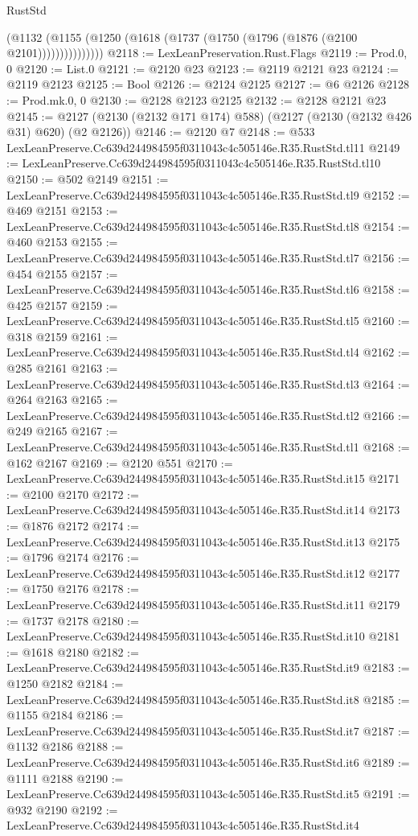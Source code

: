 \begin{lexlean}{RustStd}
\begin{coremodule}
                (@1132 (@1155 (@1250 (@1618 (@1737 (@1750 (@1796 (@1876 (@2100 @2101)))))))))))))))
@2118 := LexLeanPreservation.Rust.Flags
@2119 := Prod.{0, 0}
@2120 := List.{0}
@2121 := @2120 @23
@2123 := @2119 @2121 @23
@2124 := @2119 @2123
@2125 := Bool
@2126 := @2124 @2125
@2127 := @6 @2126
@2128 := Prod.mk.{0, 0}
@2130 := @2128 @2123 @2125
@2132 := @2128 @2121 @23
@2145 := @2127 (@2130 (@2132 @171 @174) @588) (@2127 (@2130 (@2132 @426 @31) @620) (@2 @2126))
@2146 := @2120 @7
@2148 := @533 LexLeanPreserve.Cc639d244984595f0311043c4c505146e.R35.RustStd.tl11
@2149 := LexLeanPreserve.Cc639d244984595f0311043c4c505146e.R35.RustStd.tl10
@2150 := @502 @2149
@2151 := LexLeanPreserve.Cc639d244984595f0311043c4c505146e.R35.RustStd.tl9
@2152 := @469 @2151
@2153 := LexLeanPreserve.Cc639d244984595f0311043c4c505146e.R35.RustStd.tl8
@2154 := @460 @2153
@2155 := LexLeanPreserve.Cc639d244984595f0311043c4c505146e.R35.RustStd.tl7
@2156 := @454 @2155
@2157 := LexLeanPreserve.Cc639d244984595f0311043c4c505146e.R35.RustStd.tl6
@2158 := @425 @2157
@2159 := LexLeanPreserve.Cc639d244984595f0311043c4c505146e.R35.RustStd.tl5
@2160 := @318 @2159
@2161 := LexLeanPreserve.Cc639d244984595f0311043c4c505146e.R35.RustStd.tl4
@2162 := @285 @2161
@2163 := LexLeanPreserve.Cc639d244984595f0311043c4c505146e.R35.RustStd.tl3
@2164 := @264 @2163
@2165 := LexLeanPreserve.Cc639d244984595f0311043c4c505146e.R35.RustStd.tl2
@2166 := @249 @2165
@2167 := LexLeanPreserve.Cc639d244984595f0311043c4c505146e.R35.RustStd.tl1
@2168 := @162 @2167
@2169 := @2120 @551
@2170 := LexLeanPreserve.Cc639d244984595f0311043c4c505146e.R35.RustStd.it15
@2171 := @2100 @2170
@2172 := LexLeanPreserve.Cc639d244984595f0311043c4c505146e.R35.RustStd.it14
@2173 := @1876 @2172
@2174 := LexLeanPreserve.Cc639d244984595f0311043c4c505146e.R35.RustStd.it13
@2175 := @1796 @2174
@2176 := LexLeanPreserve.Cc639d244984595f0311043c4c505146e.R35.RustStd.it12
@2177 := @1750 @2176
@2178 := LexLeanPreserve.Cc639d244984595f0311043c4c505146e.R35.RustStd.it11
@2179 := @1737 @2178
@2180 := LexLeanPreserve.Cc639d244984595f0311043c4c505146e.R35.RustStd.it10
@2181 := @1618 @2180
@2182 := LexLeanPreserve.Cc639d244984595f0311043c4c505146e.R35.RustStd.it9
@2183 := @1250 @2182
@2184 := LexLeanPreserve.Cc639d244984595f0311043c4c505146e.R35.RustStd.it8
@2185 := @1155 @2184
@2186 := LexLeanPreserve.Cc639d244984595f0311043c4c505146e.R35.RustStd.it7
@2187 := @1132 @2186
@2188 := LexLeanPreserve.Cc639d244984595f0311043c4c505146e.R35.RustStd.it6
@2189 := @1111 @2188
@2190 := LexLeanPreserve.Cc639d244984595f0311043c4c505146e.R35.RustStd.it5
@2191 := @932 @2190
@2192 := LexLeanPreserve.Cc639d244984595f0311043c4c505146e.R35.RustStd.it4

\end{coremodule}
\end{lexlean}
